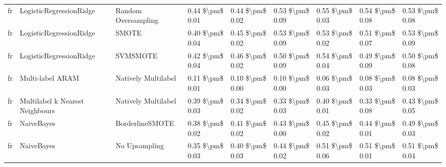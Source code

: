 \begin{tabular}{lllllllll}
      fr &         LogisticRegressionRidge &           Random Oversampling & 0.44 \$\textbackslash pm\$ 0.01 &           0.44 \$\textbackslash pm\$ 0.02 &       0.53 \$\textbackslash pm\$ 0.09 &        0.55 \$\textbackslash pm\$ 0.03 &                         0.54 \$\textbackslash pm\$ 0.08 &     0.53 \$\textbackslash pm\$ 0.08 \\
      fr &         LogisticRegressionRidge &                         SMOTE & 0.40 \$\textbackslash pm\$ 0.04 &           0.45 \$\textbackslash pm\$ 0.02 &       0.53 \$\textbackslash pm\$ 0.09 &        0.53 \$\textbackslash pm\$ 0.02 &                         0.51 \$\textbackslash pm\$ 0.07 &     0.53 \$\textbackslash pm\$ 0.09 \\
      fr &         LogisticRegressionRidge &                      SVMSMOTE & 0.42 \$\textbackslash pm\$ 0.04 &           0.46 \$\textbackslash pm\$ 0.02 &       0.50 \$\textbackslash pm\$ 0.09 &        0.54 \$\textbackslash pm\$ 0.04 &                         0.49 \$\textbackslash pm\$ 0.09 &     0.50 \$\textbackslash pm\$ 0.08 \\
      fr &                Multi-label ARAM &           Natively Multilabel & 0.11 \$\textbackslash pm\$ 0.01 &           0.10 \$\textbackslash pm\$ 0.00 &       0.10 \$\textbackslash pm\$ 0.00 &        0.06 \$\textbackslash pm\$ 0.03 &                         0.08 \$\textbackslash pm\$ 0.03 &     0.08 \$\textbackslash pm\$ 0.03 \\
      fr & Multilabel k Nearest Neighbours &           Natively Multilabel & 0.39 \$\textbackslash pm\$ 0.03 &           0.34 \$\textbackslash pm\$ 0.02 &       0.33 \$\textbackslash pm\$ 0.03 &        0.40 \$\textbackslash pm\$ 0.01 &                         0.33 \$\textbackslash pm\$ 0.08 &     0.43 \$\textbackslash pm\$ 0.05 \\
      fr &                      NaiveBayes &               BorderlineSMOTE & 0.38 \$\textbackslash pm\$ 0.02 &           0.41 \$\textbackslash pm\$ 0.02 &       0.43 \$\textbackslash pm\$ 0.00 &        0.45 \$\textbackslash pm\$ 0.02 &                         0.44 \$\textbackslash pm\$ 0.01 &     0.49 \$\textbackslash pm\$ 0.03 \\
      fr &                      NaiveBayes &                 No Upsampling & 0.35 \$\textbackslash pm\$ 0.03 &           0.40 \$\textbackslash pm\$ 0.03 &       0.44 \$\textbackslash pm\$ 0.02 &        0.51 \$\textbackslash pm\$ 0.06 &                         0.51 \$\textbackslash pm\$ 0.01 &     0.51 \$\textbackslash pm\$ 0.04 \\

\end{tabular}
